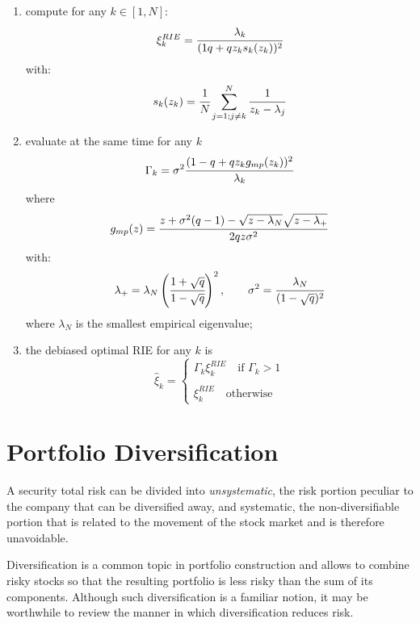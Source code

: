 \begin{enumerate}
\item compute for any $k\in[1,N]$:
\begin{equation}
\xi^{RIE}_k=\cfrac{\lambda_k}{(1q+qz_ks_k(z_k))^2}
\end{equation}
with:
\begin{equation}
s_k(z_k)=\cfrac{1}{N}\sum_{j=1;j\neq k}^{N}\cfrac{1}{z_k-\lambda_j}
\end{equation}
\item evaluate at the same time for any $k$
\begin{equation}
\Gamma_k=\sigma^2\cfrac{(1-q+q z_k g_{mp}(z_k))^2}{\lambda_k}
\end{equation}
where 
\begin{equation}
g_{mp}(z) = \cfrac{z+\sigma^2(q-1)-\sqrt{z-\lambda_N}\sqrt{z-\lambda_+}}{2qz\sigma^2}
\end{equation}
with:
\begin{equation}
\lambda_+ = \lambda_N\left(\cfrac{1+\sqrt{q}}{1-\sqrt{q}}\right)^2,\quad\quad\sigma^2=\cfrac{\lambda_N}{(1-\sqrt{q})^2}
\end{equation}
where $\lambda_N$ is the smallest empirical eigenvalue;
\item the debiased optimal RIE for any $k$ is
\begin{equation}
\hat{\xi}_k = 
\begin{cases}
\Gamma_k\xi^{RIE}_k\quad\text{if }\Gamma_k>1\\ \\
\xi^{RIE}_k\quad\text{otherwise}
\end{cases}
\end{equation}
\end{enumerate}

\section{Portfolio Diversification}

A security total risk can be divided into \emph{unsystematic}, the risk portion peculiar to the company that can be diversified away, and systematic, the non-diversifiable portion that is related to the movement of the stock market and is therefore unavoidable. 

Diversification is a common topic in portfolio construction and allows to combine risky stocks so that the resulting portfolio is less risky than the sum of its components. Although such diversification is a familiar notion, it may be worthwhile to review the manner in which diversification reduces risk.

